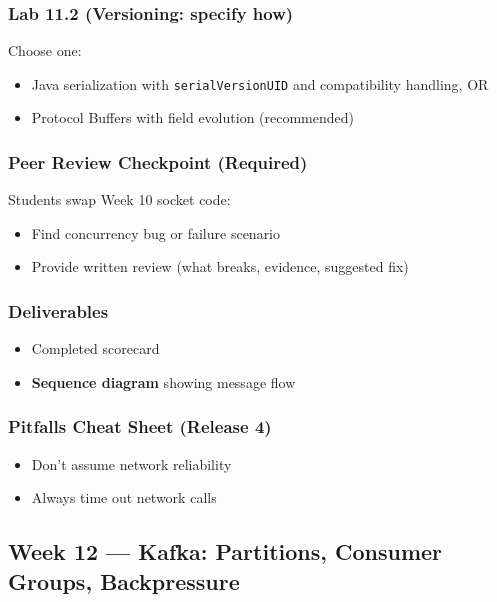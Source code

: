 \documentclass[11pt,a4paper]{article}
\begin{document}
	\subsubsection*{Lab 11.2 (Versioning: specify how)}
	Choose one:
	\begin{itemize}[leftmargin=*]
		\item Java serialization with \texttt{serialVersionUID} and compatibility handling, OR
		\item Protocol Buffers with field evolution (recommended)
	\end{itemize}
	
	\subsubsection*{Peer Review Checkpoint (Required)}
	Students swap Week 10 socket code:
	\begin{itemize}[leftmargin=*]
		\item Find concurrency bug or failure scenario
		\item Provide written review (what breaks, evidence, suggested fix)
	\end{itemize}
	
	\subsubsection*{Deliverables}
	\begin{itemize}[leftmargin=*]
		\item Completed scorecard
		\item \textbf{Sequence diagram} showing message flow
	\end{itemize}
	
	\subsubsection*{Pitfalls Cheat Sheet (Release 4)}
	\begin{itemize}[leftmargin=*]
		\item Don't assume network reliability
		\item Always time out network calls
	\end{itemize}
	
	\subsection*{Week 12 --- Kafka: Partitions, Consumer Groups, Backpressure}
	
\end{document}
